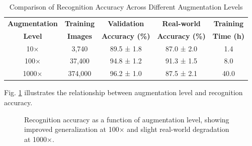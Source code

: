 \documentclass[conference]{IEEEtran}
\begin{document}
\begin{table}[h]
\centering
\caption{Comparison of Recognition Accuracy Across Different Augmentation Levels}
\label{tab:augmentation_comparison}
\begin{tabular}{|c|c|c|c|c|}
\hline
\textbf{Augmentation} & \textbf{Training} & \textbf{Validation} & \textbf{Real-world} & \textbf{Training} \\
\textbf{Level} & \textbf{Images} & \textbf{Accuracy (\%)} & \textbf{Accuracy (\%)} & \textbf{Time (h)} \\ \hline
10× & 3,740 & 89.5 ± 1.8 & 87.0 ± 2.0 & 1.4 \\ \hline
100× & 37,400 & 94.8 ± 1.2 & 91.3 ± 1.5 & 8.0 \\ \hline
1000× & 374,000 & 96.2 ± 1.0 & 87.5 ± 2.1 & 40.0 \\ \hline
\end{tabular}
\end{table}

Fig. \ref{fig:augmentation_accuracy} illustrates the relationship between augmentation level and recognition accuracy.

\begin{figure}[h]
    \centering
    \caption{Recognition accuracy as a function of augmentation level, showing improved generalization at 100× and slight real-world degradation at 1000×.}
    \label{fig:augmentation_accuracy}
\end{figure}
\end{document}
